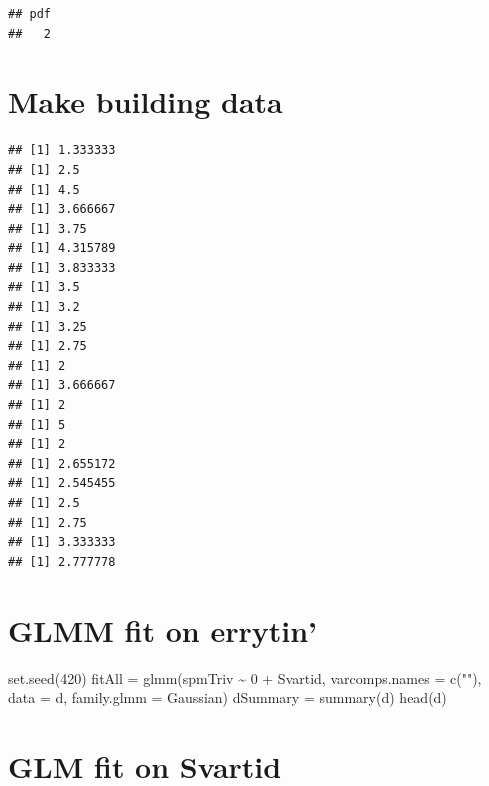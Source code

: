 \documentclass[
]{article}
\newenvironment{Shaded}{\begin{snugshade}}{\end{snugshade}}
\newcommand{\AttributeTok}[1]{\textcolor[rgb]{0.77,0.63,0.00}{#1}}
\newcommand{\ControlFlowTok}[1]{\textcolor[rgb]{0.13,0.29,0.53}{\textbf{#1}}}
\newcommand{\DecValTok}[1]{\textcolor[rgb]{0.00,0.00,0.81}{#1}}
\newcommand{\FunctionTok}[1]{\textcolor[rgb]{0.00,0.00,0.00}{#1}}
\newcommand{\NormalTok}[1]{#1}
\newcommand{\OtherTok}[1]{\textcolor[rgb]{0.56,0.35,0.01}{#1}}
\newcommand{\SpecialCharTok}[1]{\textcolor[rgb]{0.00,0.00,0.00}{#1}}
\newcommand{\StringTok}[1]{\textcolor[rgb]{0.31,0.60,0.02}{#1}}
\begin{document}
\begin{verbatim}
## pdf 
##   2
\end{verbatim}

\hypertarget{make-building-data}{%
\section{Make building data}\label{make-building-data}}

\begin{Shaded}
\end{Shaded}

\begin{verbatim}
## [1] 1.333333
## [1] 2.5
## [1] 4.5
## [1] 3.666667
## [1] 3.75
## [1] 4.315789
## [1] 3.833333
## [1] 3.5
## [1] 3.2
## [1] 3.25
## [1] 2.75
## [1] 2
## [1] 3.666667
## [1] 2
## [1] 5
## [1] 2
## [1] 2.655172
## [1] 2.545455
## [1] 2.5
## [1] 2.75
## [1] 3.333333
## [1] 2.777778
\end{verbatim}

\hypertarget{glmm-fit-on-errytin}{%
\section{GLMM fit on errytin'}\label{glmm-fit-on-errytin}}

\begin{Shaded}
\begin{Highlighting}[]
\FunctionTok{set.seed}\NormalTok{(}\DecValTok{420}\NormalTok{)}
\NormalTok{fitAll }\OtherTok{=} \FunctionTok{glmm}\NormalTok{(spmTriv }\SpecialCharTok{\textasciitilde{}} \DecValTok{0} \SpecialCharTok{+}\NormalTok{ Svartid, }\AttributeTok{varcomps.names =} \FunctionTok{c}\NormalTok{(}\StringTok{""}\NormalTok{), }\AttributeTok{data =}\NormalTok{ d, }\AttributeTok{family.glmm =}\NormalTok{ Gaussian)}
\NormalTok{dSummary }\OtherTok{=} \FunctionTok{summary}\NormalTok{(d)}
\FunctionTok{head}\NormalTok{(d)}
\end{Highlighting}
\end{Shaded}

\hypertarget{glm-fit-on-svartid}{%
\section{GLM fit on Svartid}\label{glm-fit-on-svartid}}
\end{document}

